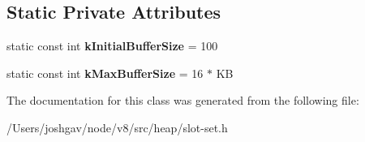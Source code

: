 \subsection*{Static Private Attributes}
\begin{DoxyCompactItemize}
\item 
static const int {\bfseries k\+Initial\+Buffer\+Size} = 100\hypertarget{classv8_1_1internal_1_1_typed_slot_set_a4d5680b9e9f2563af824c99f9bbcfbd3}{}\label{classv8_1_1internal_1_1_typed_slot_set_a4d5680b9e9f2563af824c99f9bbcfbd3}

\item 
static const int {\bfseries k\+Max\+Buffer\+Size} = 16 $\ast$ KB\hypertarget{classv8_1_1internal_1_1_typed_slot_set_a0d1785f0ded6a0a10620582aa747594b}{}\label{classv8_1_1internal_1_1_typed_slot_set_a0d1785f0ded6a0a10620582aa747594b}

\end{DoxyCompactItemize}


The documentation for this class was generated from the following file\+:\begin{DoxyCompactItemize}
\item 
/\+Users/joshgav/node/v8/src/heap/slot-\/set.\+h\end{DoxyCompactItemize}
